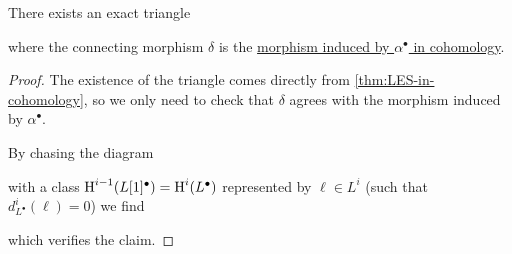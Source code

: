 \documentclass[../../../main]{subfiles}
\begin{document}
\begin{proposition} \label{prop:connecting-iso-cohomology}
  There exists an exact triangle
  \begin{center}
  \end{center}
  where the connecting morphism \(\delta\) is the \hyperref[thm:LES-in-cohomology]{morphism induced by \(\alpha^{\bullet}\) in cohomology}.
\end{proposition}
\begin{proof}
  The existence of the triangle comes directly from \autoref{thm:LES-in-cohomology}, so we only need to check that \(\delta\) agrees with the morphism induced by \(\alpha^{\bullet}\).

  By chasing the diagram
  \begin{center}
  \end{center}
  with a class \(\operatorname{H}^{i-1}(L[1]^{\bullet}) = \operatorname{H}^{i}(L^{\bullet})\) represented by \(\ell \in L^{i}\) (such that \(d_{L^{\bullet}}^{i}(\ell) = 0\)) we find
  \begin{center}
  \end{center}
  which verifies the claim.
\end{proof}
\end{document}
